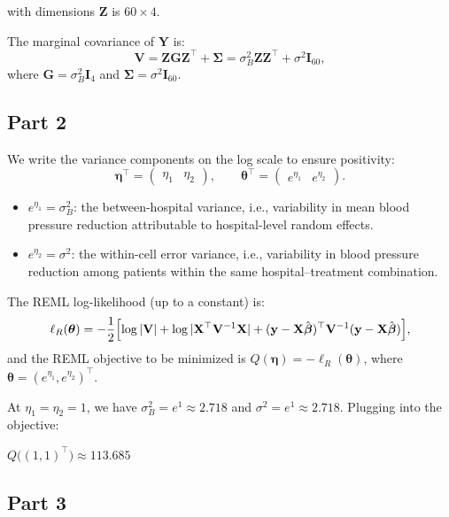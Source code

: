 \documentclass[letterpaper]{article}
\begin{document}
			{with dimensions} $\mathbf{Z}$ is $60 \times 4$.
			
			The marginal covariance of $\mathbf{Y}$ is:
			\[
			\mathbf{V} = \mathbf{Z}\mathbf{G}\mathbf{Z}^\top + \boldsymbol{\Sigma}
			= \sigma^2_B \mathbf{Z}\mathbf{Z}^\top + \sigma^2 \mathbf{I}_{60},
			\]
			where $\mathbf{G} = \sigma^2_B \mathbf{I}_4$ and
			$\boldsymbol{\Sigma} = \sigma^2 \mathbf{I}_{60}$.
			
			\subsection{Part 2}
			
			We write the variance components on the log scale to ensure positivity:
			\[
			\boldsymbol{\eta}^\top = \begin{pmatrix} \eta_1 & \eta_2 \end{pmatrix},
			\qquad
			\boldsymbol{\theta}^\top = \begin{pmatrix} e^{\eta_1} & e^{\eta_2} \end{pmatrix}.
			\]
			
			\begin{itemize}
				\item $e^{\eta_1} = \sigma^2_B$: the {between-hospital variance},
				i.e., variability in mean blood pressure reduction attributable to
				hospital-level random effects.
				\item $e^{\eta_2} = \sigma^2$: the {within-cell error variance},
				i.e., variability in blood pressure reduction among patients within
				the same hospital--treatment combination.
			\end{itemize}

			
			The REML log-likelihood (up to a constant) is:
			\[
			\ell_R(\boldsymbol{\theta})
			= -\frac{1}{2}\Bigl[
			\log|\mathbf{V}|
			+ \log|\mathbf{X}^\top\mathbf{V}^{-1}\mathbf{X}|
			+ (\mathbf{y}-\mathbf{X}\hat{\boldsymbol{\beta}})^\top
			\mathbf{V}^{-1}
			(\mathbf{y}-\mathbf{X}\hat{\boldsymbol{\beta}})
			\Bigr],
			\]
			and the REML objective to be minimized is $Q(\boldsymbol{\eta}) = -\ell_R(\boldsymbol{\theta})$, where $\boldsymbol{\theta} = (e^{\eta_1}, e^{\eta_2})^\top$.
			

			At $\eta_1 = \eta_2 = 1$, we have $\sigma^2_B = e^1 \approx 2.718$ and
			$\sigma^2 = e^1 \approx 2.718$. Plugging into the objective:
			
			$
			{Q\bigl((1,1)^\top\bigr) \approx 113.685}
			$
			
			\subsection{Part 3}
			
\end{document}
